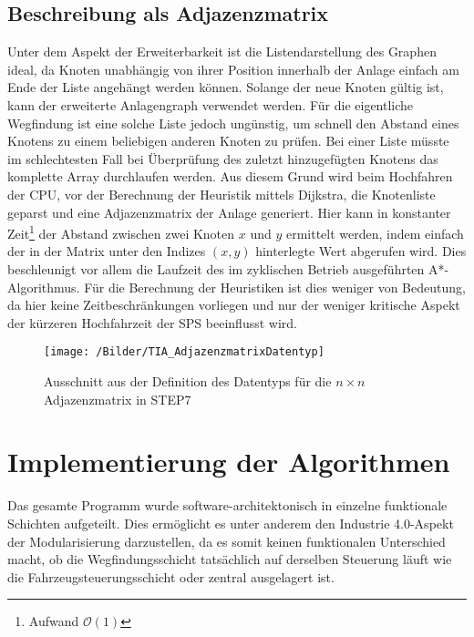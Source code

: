 		\subsection{Beschreibung als Adjazenzmatrix}
			\label{Adjazenzmatrix}
			Unter dem Aspekt der Erweiterbarkeit ist die Listendarstellung des Graphen ideal, da Knoten unabhängig von ihrer Position innerhalb der Anlage einfach am Ende der Liste angehängt werden können. Solange der neue Knoten gültig ist, kann der erweiterte Anlagengraph verwendet werden. Für die eigentliche Wegfindung ist eine solche Liste jedoch ungünstig, um schnell den Abstand eines Knotens zu einem beliebigen anderen Knoten zu prüfen. Bei einer Liste müsste im schlechtesten Fall bei Überprüfung des zuletzt hinzugefügten Knotens das komplette Array durchlaufen werden. Aus diesem Grund wird beim Hochfahren der CPU, vor der Berechnung der Heuristik mittels Dijkstra, die Knotenliste geparst und eine Adjazenzmatrix der Anlage generiert. Hier kann in konstanter Zeit\footnote{Aufwand $\mathcal{O}(1)$} der Abstand zwischen zwei Knoten $x$ und $y$ ermittelt werden, indem einfach der in der Matrix unter den Indizes $(x,y)$ hinterlegte Wert abgerufen wird. Dies beschleunigt vor allem die Laufzeit des im zyklischen Betrieb ausgeführten A*-Algorithmus. Für die Berechnung der Heuristiken ist dies weniger von Bedeutung, da hier keine Zeitbeschränkungen vorliegen und nur der weniger kritische Aspekt der kürzeren Hochfahrzeit der \ac{SPS} beeinflusst wird.
			
			\begin{figure}
				\centering
				\texttt{[image: /Bilder/TIA\_AdjazenzmatrixDatentyp]}
				\vspace{0.2cm}
				\caption{Ausschnitt aus der Definition des Datentyps für die $n\times n$ Adjazenzmatrix in \ac{STEP7}}
			\end{figure}

	\section{Implementierung der Algorithmen}
		
	
		Das gesamte Programm wurde software-architektonisch in einzelne funktionale Schichten aufgeteilt. Dies ermöglicht es unter anderem den Industrie 4.0-Aspekt der Modularisierung darzustellen, da es somit keinen funktionalen Unterschied macht, ob die Wegfindungsschicht tatsächlich auf derselben Steuerung läuft wie die Fahrzeugsteuerungsschicht oder zentral ausgelagert ist.
		
